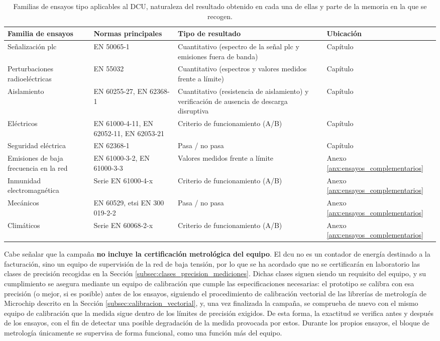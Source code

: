 \begin{table}[!h]
\centering
\small
\begin{tabular}{|p{3.2cm}|p{4.4cm}|p{4.6cm}|p{1.8cm}|}
\hline
\textbf{Familia de ensayos} & \textbf{Normas principales} & \textbf{Tipo de resultado} & \textbf{Ubicación} \\ \hline
Señalización \gls{plc} & EN 50065-1 & Cuantitativo (espectro de la señal \gls{plc} y emisiones fuera de banda) & Capítulo \\ \hline
Perturbaciones radioeléctricas & EN 55032 & Cuantitativo (espectros y valores medidos frente a límite) & Capítulo \\ \hline
Aislamiento & EN 60255-27, EN 62368-1 & Cuantitativo (resistencia de aislamiento) y verificación de ausencia de descarga disruptiva & Capítulo \\ \hline
Eléctricos & EN 61000-4-11, EN 62052-11, EN 62053-21 & Criterio de funcionamiento (A/B) & Capítulo \\ \hline
Seguridad eléctrica & EN 62368-1 & Pasa / no pasa & Capítulo \\ \hline
Emisiones de baja frecuencia en la red & EN 61000-3-2, EN 61000-3-3 & Valores medidos frente a límite & Anexo \ref{anx:ensayos_complementarios}\\ \hline
Inmunidad electromagnética & Serie EN 61000-4-x & Criterio de funcionamiento (A/B) & Anexo \ref{anx:ensayos_complementarios}\\ \hline
Mecánicos & EN 60529, \gls{etsi} EN 300 019-2-2 & Pasa / no pasa & Anexo \ref{anx:ensayos_complementarios}\\ \hline
Climáticos & Serie EN 60068-2-x & Criterio de funcionamiento (A/B) & Anexo \ref{anx:ensayos_complementarios}\\ \hline
\end{tabular}
\caption{Familias de ensayos tipo aplicables al DCU, naturaleza del resultado obtenido en cada una de ellas y parte de la memoria en la que se recogen.}
\label{tab:familias_ensayos}
\end{table}

Cabe señalar que la campaña \textbf{no incluye la certificación metrológica del equipo}. El \gls{dcu} no es un contador de energía destinado a la facturación, sino un equipo de supervisión de la red de baja tensión, por lo que se ha acordado que no se certificarán en laboratorio las clases de precisión recogidas en la Sección \ref{subsec:clases_precision_mediciones}. Dichas clases siguen siendo un requisito del equipo, y su cumplimiento se asegura mediante un equipo de calibración que cumple las especificaciones necesarias: el prototipo se calibra con esa precisión (o mejor, si es posible) antes de los ensayos, siguiendo el procedimiento de calibración vectorial de las librerías de metrología de Microchip descrito en la Sección \ref{subsec:calibracion_vectorial}, y, una vez finalizada la campaña, se comprueba de nuevo con el mismo equipo de calibración que la medida sigue dentro de los límites de precisión exigidos. De esta forma, la exactitud se verifica antes y después de los ensayos, con el fin de detectar una posible degradación de la medida provocada por estos. Durante los propios ensayos, el bloque de metrología únicamente se supervisa de forma funcional, como una función más del equipo.

